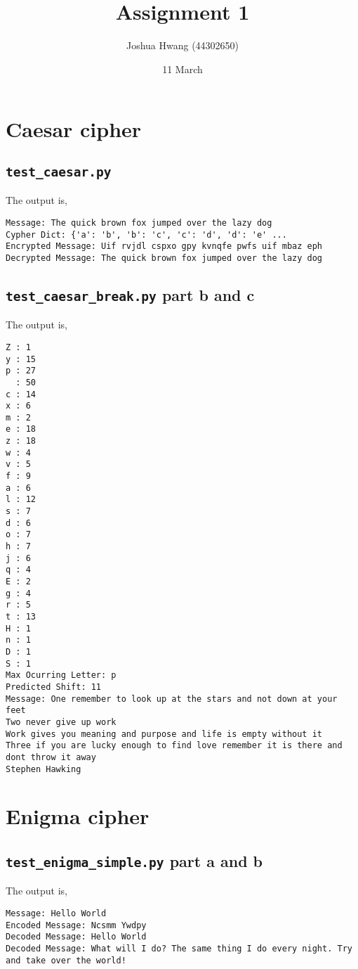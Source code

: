 \documentclass{article}
\title{Assignment 1}
\author{Joshua Hwang (44302650)}
\date{11 March}
\begin{document}
\maketitle
\section{Caesar cipher}
\subsection{\texttt{test\_caesar.py}}


The output is,
\begin{verbatim}
Message: The quick brown fox jumped over the lazy dog
Cypher Dict: {'a': 'b', 'b': 'c', 'c': 'd', 'd': 'e' ...
Encrypted Message: Uif rvjdl cspxo gpy kvnqfe pwfs uif mbaz eph
Decrypted Message: The quick brown fox jumped over the lazy dog
\end{verbatim}

\subsection{\texttt{test\_caesar\_break.py} part b and c}


The output is,
\begin{verbatim}
Z : 1
y : 15
p : 27
  : 50
c : 14
x : 6
m : 2
e : 18
z : 18
w : 4
v : 5
f : 9
a : 6
l : 12
s : 7
d : 6
o : 7
h : 7
j : 6
q : 4
E : 2
g : 4
r : 5
t : 13
H : 1
n : 1
D : 1
S : 1
Max Ocurring Letter: p
Predicted Shift: 11
Message: One remember to look up at the stars and not down at your feet
Two never give up work
Work gives you meaning and purpose and life is empty without it
Three if you are lucky enough to find love remember it is there and dont throw it away
Stephen Hawking
\end{verbatim}

\section{Enigma cipher}
\subsection{\texttt{test\_enigma\_simple.py} part a and b}


The output is,
\begin{verbatim}
Message: Hello World
Encoded Message: Ncsmm Ywdpy
Decoded Message: Hello World
Decoded Message: What will I do? The same thing I do every night. Try and take over the world!
\end{verbatim}
\end{document}

